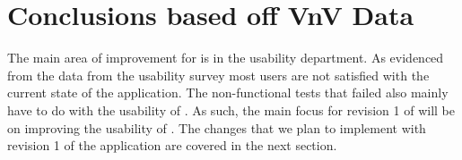 \documentclass[12pt, titlepage]{article}
\begin{document}

					
					
					
					



		

					
					
					
					


	



\section{Conclusions based off VnV Data}

The main area of improvement for \progname{} is in the usability department. As evidenced from the data from the usability survey most users are not satisfied with the current state of the \progname{} application. The non-functional tests that failed also mainly have to do with the usability of \progname{}. As such, the main focus for revision 1 of \progname{} will be on improving the usability of \progname{}. The changes that we plan to implement with revision 1 of the \progname{} application are covered in the next section.
\end{document}
